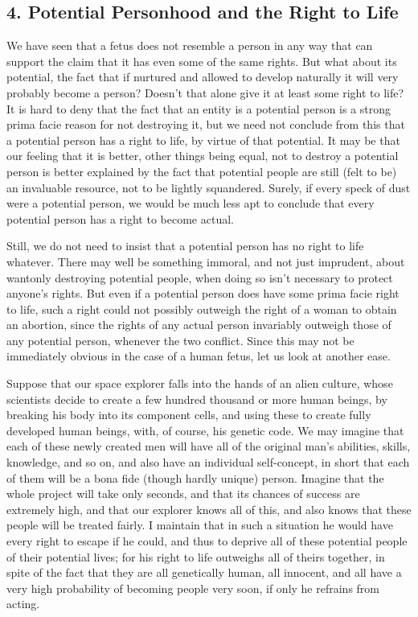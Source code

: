 \subsection{4. Potential Personhood and the Right to Life}

We have seen that a fetus does not resemble a person in
any way that can support the claim that it has even some
of the same rights. But what about its potential, the fact
that if nurtured and allowed to develop naturally it will
very probably become a person? Doesn’t that alone give it
at least some right to life? It is hard to deny that the fact
that an entity is a potential person is a strong prima facie
reason for not destroying it, but we need not conclude
from this that a potential person has a right to life, by
virtue of that potential. It may be that our feeling that it is
better, other things being equal, not to destroy a potential
person is better explained by the fact that potential people
are still (felt to be) an invaluable resource, not to be
lightly squandered. Surely, if every speck of dust were a
potential person, we would be much less apt to conclude
that every potential person has a right to become actual.

Still, we do not need to insist that a potential person has
no right to life whatever. There may well be something
immoral, and not just imprudent, about wantonly
destroying potential people, when doing so isn’t necessary
to protect anyone’s rights. But even if a potential person
does have some prima facie right to life, such a right
could not possibly outweigh the right of a woman to
obtain an abortion, since the rights of any actual person
invariably outweigh those of any potential person,
whenever the two conflict. Since this may not be
immediately obvious in the case of a human fetus, let us
look at another ease.

Suppose that our space explorer falls into the hands of an
alien culture, whose scientists decide to create a few
hundred thousand or more human beings, by breaking his
body into its component cells, and using these to create
fully developed human beings, with, of course, his genetic
code. We may imagine that each of these newly created
men will have all of the original man’s abilities, skills,
knowledge, and so on, and also have an individual
self-concept, in short that each of them will be a bona fide
(though hardly unique) person. Imagine that the whole
project will take only seconds, and that its chances of
success are extremely high, and that our explorer knows
all of this, and also knows that these people will be treated
fairly. I maintain that in such a situation he would have
every right to escape if he could, and thus to deprive all of
these potential people of their potential lives; for his right
to life outweighs all of theirs together, in spite of the fact
that they are all genetically human, all innocent, and all
have a very high probability of becoming people very
soon, if only he refrains from acting.

